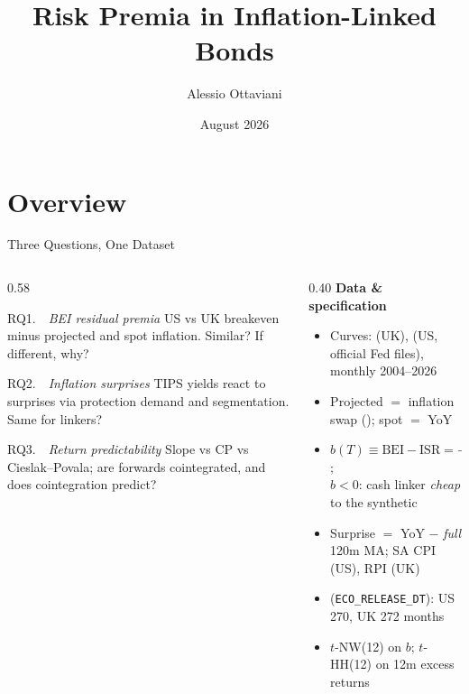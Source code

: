 \title{Risk Premia in Inflation-Linked Bonds}
\author{Alessio Ottaviani}
\date{August 2026}



\begin{frame}[plain]
  \titlepage
\end{frame}

\section{Overview}

\begin{frame}[t]{Three Questions, One Dataset}
\vspace{0.35cm}
\begin{columns}[T]
\begin{column}{0.58\textwidth}
  \begin{block}{\normalsize RQ1.\ \ \emph{BEI residual premia}}
  US vs UK breakeven minus projected and spot inflation. Similar? If different, why?
  \end{block}
  \begin{block}{\normalsize RQ2.\ \ \emph{Inflation surprises}}
  TIPS yields react to surprises via protection demand and segmentation. Same for linkers?
  \end{block}
  \begin{block}{\normalsize RQ3.\ \ \emph{Return predictability}}
  Slope vs CP vs Cieslak--Povala; are forwards cointegrated, and does cointegration predict?
  \end{block}
\end{column}
\begin{column}{0.40\textwidth}
  \scriptsize
  \textbf{Data \& specification}
  \begin{itemize}\itemsep=0.07cm\scriptsize
    \item Curves:  (UK),  (US, official Fed files), monthly 2004--2026
    \item Projected $=$ inflation swap (); spot $=$ YoY
    \item {} $b(T)\equiv\text{BEI}-\text{ISR}=-\lambda(T)$;\\
          $b<0$: cash linker \emph{cheap} to the synthetic
    \item Surprise $=$ YoY $-$ \emph{full} 120m MA; SA CPI (US), RPI (UK)
    \item {} (\texttt{ECO\_RELEASE\_DT}): US 270, UK 272 months
    \item $t$-NW(12) on $b$; $t$-HH(12) on 12m excess returns
  \end{itemize}
\end{column}
\end{columns}
\end{frame}

